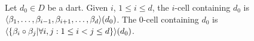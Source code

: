 Let $d_0 \in D$ be a dart. Given $i$, $1\leq i \leq d$,
the $i$-cell containing $d_0$ is 
$\langle{}\beta_1,\ldots,\beta_{i-1},\beta_{i+1},\ldots,\beta_d\rangle{}(d_0)$.
The $0$-cell  containing $d_0$ is 
$\langle{}\{\beta_{i}\circ\beta_{j}|\forall i,j: 1\leq i<j \leq d\}\rangle{}(d_0)$.



